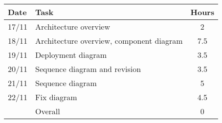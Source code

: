 \begin{table}[H]
\begin{tabularx}{\textwidth}{|l|X|c|}
\hline
\rowcolor[HTML]{C0C0C0} 
Date & Task & Hours\\ \hline
17/11 & Architecture overview & 2\\ \hline
18/11 & Architecture overview, component diagram & 7.5 \\ \hline
19/11 & Deployment diagram & 3.5\\ \hline
20/11 & Sequence diagram and revision & 3.5\\ \hline
21/11 & Sequence diagram & 5 \\ \hline
22/11 & Fix diagram & 4.5 \\ \hline
\rowcolor[HTML]{C0C0C0} 
& Overall & 0 \\ \hline
\end{tabularx}
\end{table}
